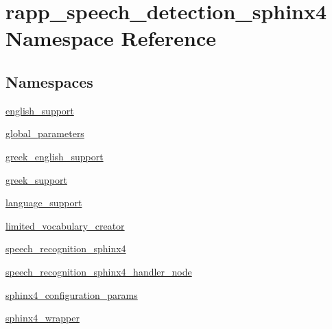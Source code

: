 \hypertarget{namespacerapp__speech__detection__sphinx4}{\section{rapp\-\_\-speech\-\_\-detection\-\_\-sphinx4 Namespace Reference}
\label{namespacerapp__speech__detection__sphinx4}
}
\subsection*{Namespaces}
\begin{DoxyCompactItemize}
\item 
\hyperlink{namespacerapp__speech__detection__sphinx4_1_1english__support}{english\-\_\-support}
\item 
\hyperlink{namespacerapp__speech__detection__sphinx4_1_1global__parameters}{global\-\_\-parameters}
\item 
\hyperlink{namespacerapp__speech__detection__sphinx4_1_1greek__english__support}{greek\-\_\-english\-\_\-support}
\item 
\hyperlink{namespacerapp__speech__detection__sphinx4_1_1greek__support}{greek\-\_\-support}
\item 
\hyperlink{namespacerapp__speech__detection__sphinx4_1_1language__support}{language\-\_\-support}
\item 
\hyperlink{namespacerapp__speech__detection__sphinx4_1_1limited__vocabulary__creator}{limited\-\_\-vocabulary\-\_\-creator}
\item 
\hyperlink{namespacerapp__speech__detection__sphinx4_1_1speech__recognition__sphinx4}{speech\-\_\-recognition\-\_\-sphinx4}
\item 
\hyperlink{namespacerapp__speech__detection__sphinx4_1_1speech__recognition__sphinx4__handler__node}{speech\-\_\-recognition\-\_\-sphinx4\-\_\-handler\-\_\-node}
\item 
\hyperlink{namespacerapp__speech__detection__sphinx4_1_1sphinx4__configuration__params}{sphinx4\-\_\-configuration\-\_\-params}
\item 
\hyperlink{namespacerapp__speech__detection__sphinx4_1_1sphinx4__wrapper}{sphinx4\-\_\-wrapper}
\end{DoxyCompactItemize}
